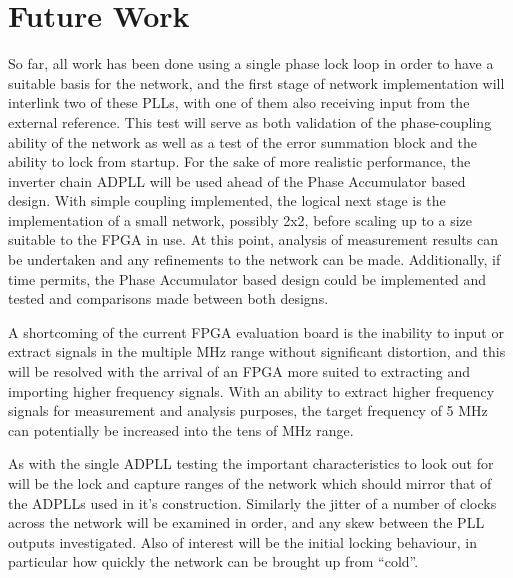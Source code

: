 \documentclass[11pt,english,british]{report}
\begin{document}
\chapter{Future Work}
So far, all work has been done using a single phase lock loop in order to have a suitable basis for the network, and the first stage of network implementation will interlink two  of these PLLs, with one of them also receiving input from the external reference. This test will serve as both validation of the phase-coupling ability of the network as well as a test of the error summation block and the ability to lock from startup. For the sake of more realistic performance, the inverter chain ADPLL will be used ahead of the Phase Accumulator based design. With simple coupling implemented, the logical next stage is the implementation of a small network, possibly 2x2, before scaling up to a size suitable to the FPGA in use. At this point, analysis of measurement results can be undertaken and any refinements to the network can be made. Additionally, if time permits, the Phase Accumulator based design could be implemented and tested and comparisons made between both designs.

A shortcoming of the current FPGA evaluation board is the inability to input or extract signals in the multiple MHz range without significant distortion, and this will be resolved with the arrival of an FPGA more suited to extracting and importing higher frequency signals. With an ability to extract higher frequency signals for measurement and analysis purposes, the target frequency of 5 MHz can potentially be increased into the tens of MHz range.

As with the single ADPLL testing the important characteristics to look out for will be the lock and capture ranges of the network which should mirror that of the ADPLLs used in it's construction. Similarly the jitter of a number of clocks across the network will be examined in order, and any skew between the PLL outputs investigated. Also of interest will be the initial locking behaviour, in particular how quickly the network can be brought up from ``cold''.

\newpage
 

\end{document}
